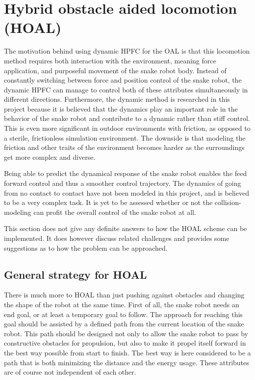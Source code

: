 \section{Hybrid obstacle aided locomotion (HOAL)}\label{sec:dhpfc-oal}

The motivation behind using dynamic HPFC for the OAL is that this locomotion method requires both interaction with the environment, meaning force application, and purposeful movement of the snake robot body. Instead of constantly switching between force and position control of the snake robot, the dynamic HPFC can manage to control both of these attributes simultaneously in different directions. Furthermore, the dynamic method is researched in this project because it is believed that the dynamics play an important role in the behavior of the snake robot and contribute to a dynamic rather than stiff control. This is even more significant in outdoor environments with friction, as opposed to a sterile, frictionless simulation environment. The downside is that modeling the friction and other traits of the environment becomes harder as the surroundings get more complex and diverse.

Being able to predict the dynamical response of the snake robot enables the feed forward control and thus a smoother control trajectory. 
The dynamics of going from no contact to contact have not been modeled in this project, and is believed to be a very complex task. It is yet to be assessed whether or not the collision-modeling can profit the overall control of the snake robot at all.

This section does not give any definite answers to how the HOAL scheme can be implemented. It does however discuss related challenges and provides some suggestions as to how the problem can be approached.

\subsection{General strategy for HOAL}

There is much more to HOAL than just pushing against obstacles and changing the shape of the robot at the same time. First of all, the snake robot needs an end goal, or at least a temporary goal to follow. The approach for reaching this goal should be assisted by a defined path from the current location of the snake robot. This path should be designed not only to allow the snake robot to pass by constructive obstacles for propulsion, but also to make it propel itself forward in the best way possible from start to finish. The best way is here considered to be a path that is both minimizing the distance and the energy usage. These attributes are of course not independent of each other.

